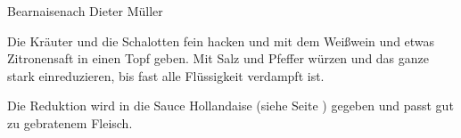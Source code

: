 \begin{recipe}{Bearnaise}{nach Dieter Müller}
  \label{Bearnaise}
  \inglist
  
  \steps
  Die Kräuter und die Schalotten fein hacken und mit dem Weißwein und etwas Zitronensaft
  in einen Topf geben. Mit Salz und Pfeffer würzen und das ganze stark einreduzieren, bis
  fast alle Flüssigkeit verdampft ist.

  Die Reduktion wird in die Sauce Hollandaise (siehe Seite \pageref{Hollandaise}) gegeben 
  und passt gut zu gebratenem Fleisch.
\end{recipe}


